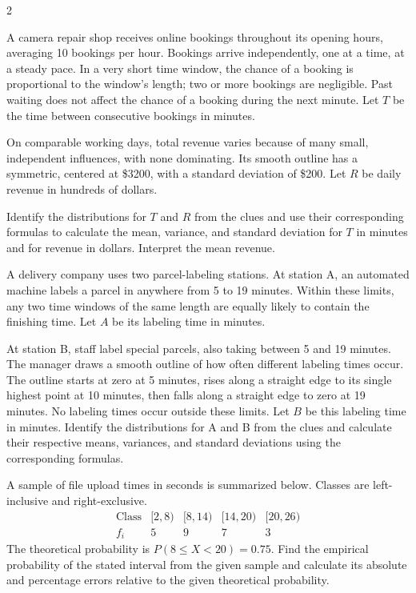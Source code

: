\begin{multicols}{2}
\label{sec:c5-2}

A camera repair shop receives online bookings throughout its opening hours,
averaging 10 bookings per hour. Bookings arrive independently, one at a time,
at a steady pace. In a very short time window, the chance of a booking is
proportional to the window's length; two or more bookings are negligible.
Past waiting does not affect the chance of a booking during the next minute.
Let $T$ be the time between consecutive bookings in minutes.

On comparable working days, total revenue varies because of many small,
independent influences, with none dominating. Its smooth outline has a symmetric, centered at \$3200, with a standard deviation of \$200. Let $R$ be daily revenue in hundreds
of dollars.

Identify the distributions for $T$ and $R$ from the clues and use their
corresponding formulas to calculate the mean, variance, and standard deviation
for $T$ in minutes and for revenue in dollars. Interpret the mean revenue.


\newpage

\label{sec:c5-3}
A delivery company uses two parcel-labeling stations. At station A, an automated
machine labels a parcel in anywhere from 5 to 19 minutes. Within these limits,
any two time windows of the same length are equally likely to contain the
finishing time. Let $A$ be its labeling time in minutes.

At station B, staff label special parcels, also taking between 5 and 19 minutes.
The manager draws a smooth outline of how often different labeling times occur.
The outline starts at zero at 5 minutes, rises along a straight edge to its
single highest point at 10 minutes, then falls along a straight edge to zero
at 19 minutes. No labeling times occur outside these limits.
Let $B$ be this labeling time in minutes.
Identify the distributions for A and B from the clues and calculate their respective means, variances, and standard deviations using the corresponding formulas. 


\label{sec:c6-1}
A sample of file upload times in seconds is summarized below.
Classes are left-inclusive and right-exclusive.
\[
\begin{array}{c|rrrr}
\text{Class}&[2,8)&[8,14)&[14,20)&[20,26)\\\hline
f_i&5&9&7&3
\end{array}
\]
The theoretical probability is $P(8\le X<20)=0.75$.
Find the empirical probability of the stated interval from the given sample and calculate its absolute and percentage errors relative to the given theoretical probability. 



\end{multicols}
